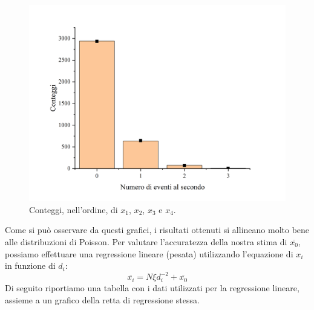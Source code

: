 \documentclass{article}
\begin{document}
\begin{center}
\begin{figure}[H]
        \includegraphics[trim={2cm .5cm 2.4cm 2.1cm},clip,width=.5\textwidth]{img/Geiger5.jpg}
        \caption{Conteggi, nell'ordine, di $x_1$, $x_2$, $x_3$ e $x_4$.}
    \end{figure}
\end{center}

Come si può osservare da questi grafici, i risultati ottenuti si allineano molto bene
alle distribuzioni di Poisson.
Per valutare l'accuratezza della nostra stima di $\overline{x_0}$, possiamo effettuare
una regressione lineare (pesata) utilizzando l'equazione di $x_i$ in funzione di $d_i$:
\[\overline{x_i} = N\xi d_i^{-2} + \overline{x_0}\]
Di seguito riportiamo una tabella con i dati utilizzati per la regressione lineare,
assieme a un grafico della retta di regressione stessa.
\end{document}
